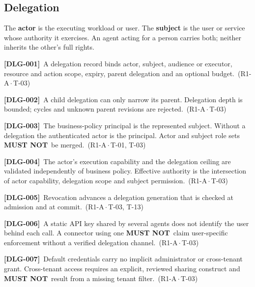 \documentclass[11pt,a4paper]{article}
\newcommand{\mustnot}{\textbf{MUST NOT}}
\newcommand{\term}[1]{\textbf{#1}}
\newcommand{\reqtag}[2]{{\footnotesize\color{accent}(#1\,$\cdot$\,#2)}}
\newcommand{\req}[4]{\par\noindent\hypertarget{req:#1}{\textbf{[#1]}}\ #4\ \reqtag{#2}{#3}\par}
\begin{document}
\subsection{Delegation}
The \term{actor} is the executing workload or user. The \term{subject} is the user or service whose authority it exercises. An agent acting for a person carries both; neither inherits the other's full rights.
\req{DLG-001}{R1-A}{T-03}{A delegation record binds actor, subject, audience or executor, resource and action scope, expiry, parent delegation and an optional budget.}
\req{DLG-002}{R1-A}{T-03}{A child delegation can only narrow its parent. Delegation depth is bounded; cycles and unknown parent revisions are rejected.}
\req{DLG-003}{R1-A}{T-01, T-03}{The business-policy principal is the represented subject. Without a delegation the authenticated actor is the principal. Actor and subject role sets \mustnot\ be merged.}
\req{DLG-004}{R1-A}{T-03}{The actor's execution capability and the delegation ceiling are validated independently of business policy. Effective authority is the intersection of actor capability, delegation scope and subject permission.}
\req{DLG-005}{R1-A}{T-03, T-13}{Revocation advances a delegation generation that is checked at admission and at commit.}
\req{DLG-006}{R1-A}{T-03}{A static API key shared by several agents does not identify the user behind each call. A connector using one \mustnot\ claim user-specific enforcement without a verified delegation channel.}
\req{DLG-007}{R1-A}{T-03}{Default credentials carry no implicit administrator or cross-tenant grant. Cross-tenant access requires an explicit, reviewed sharing construct and \mustnot\ result from a missing tenant filter.}
\end{document}
